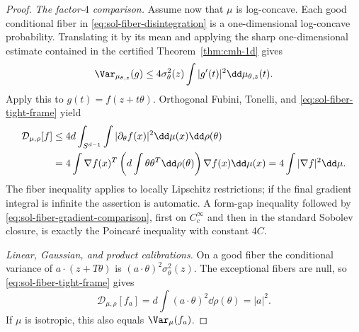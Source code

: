 \documentclass[../main.tex]{subfiles}
\begin{document}
\begin{proof}
\emph{The factor-$4$ comparison.}
Assume now that $\mu$ is log-concave.  Each good conditional fiber in
\eqref{eq:sol-fiber-disintegration} is a one-dimensional log-concave probability.  Translating
it by its mean and applying the sharp one-dimensional estimate contained in the certified
Theorem~\ref{thm:cmh-1d} gives
\begin{equation}
  \Var_{\mu_{\theta,z}}(g)
  \le4\sigma_\theta^2(z)
       \int|g'(t)|^2\dd\mu_{\theta,z}(t).
  \label{eq:sol-fiber-one-dimensional}
\end{equation}
Apply this to $g(t)=f(z+t\theta)$.  Orthogonal Fubini, Tonelli, and
\eqref{eq:sol-fiber-tight-frame} yield
\begin{align}
 \mathcal D_{\mu,\rho}[f]
 &\le4d\int_{S^{d-1}}\int|\partial_\theta f(x)|^2
       \dd\mu(x)\dd\rho(\theta)\notag\\
 &=4\int\nabla f(x)^T
 \left(d\int\theta\theta^T\dd\rho(\theta)\right)
 \nabla f(x)\dd\mu(x)
 =4\int|\nabla f|^2\dd\mu.
 \label{eq:sol-fiber-tight-comparison-proof}
\end{align}
The fiber inequality applies to locally Lipschitz restrictions; if the final gradient integral
is infinite the assertion is automatic.  A form-gap inequality followed by
\eqref{eq:sol-fiber-gradient-comparison}, first on $C_c^\infty$ and then in the standard
Sobolev closure, is exactly the Poincar\'e inequality with constant $4C$.

\emph{Linear, Gaussian, and product calibrations.}
On a good fiber the conditional variance of $a\cdot(z+T\theta)$ is
$(a\cdot\theta)^2\sigma_\theta^2(z)$.  The exceptional fibers are null, so
\eqref{eq:sol-fiber-tight-frame} gives
\begin{equation}
  \mathcal D_{\mu,\rho}[f_a]
  =d\int(a\cdot\theta)^2\dd\rho(\theta)=|a|^2.
\end{equation}
If $\mu$ is isotropic, this also equals $\Var_\mu(f_a)$.


\end{proof}
\end{document}
